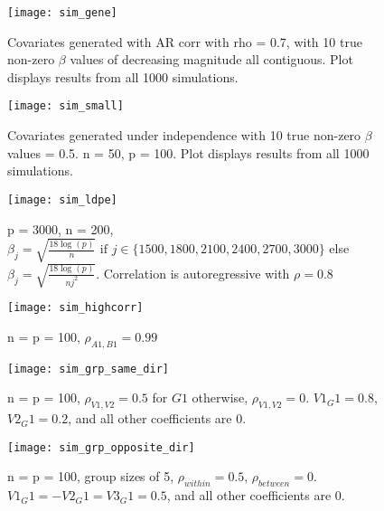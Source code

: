 \begin{figure}[hbtp]
    \begin{center}
    \texttt{[image: sim\_gene]}
    \caption{\label{Fig:sim_gene} Covariates generated with AR corr with rho = 0.7, with 10 true non-zero $\beta$ values of decreasing magnitude all contiguous. Plot displays results from all 1000 simulations.}
    \end{center}
\end{figure}

\begin{figure}[hbtp]
    \begin{center}
    \texttt{[image: sim\_small]}
    \caption{\label{Fig:sim_small} Covariates generated under independence with 10 true non-zero $\beta$ values = 0.5. n = 50, p = 100. Plot displays results from all 1000 simulations.}
    \end{center}
\end{figure}


\begin{figure}[hbtp]
    \begin{center}
    \texttt{[image: sim\_ldpe]}
    \caption{\label{Fig:sim_ldpe} p = 3000, n = 200, $\beta_j = \sqrt{\frac{18\log(p)}{n}} \text{ if } j \in \lbrace 1500, 1800, 2100, 2400, 2700, 3000 \rbrace$ else $\beta_j = \sqrt{\frac{18\log(p)}{nj^2}}$. Correlation is autoregressive with $\rho = 0.8$}
    \end{center}
\end{figure}


\begin{figure}[hbtp]
    \begin{center}
    \texttt{[image: sim\_highcorr]}
    \caption{\label{Fig:sim_highcorr} n = p = 100, $\rho_{A1, B1} = 0.99$}
    \end{center}
\end{figure}

\begin{figure}[hbtp]
    \begin{center}
    \texttt{[image: sim\_grp\_same\_dir]}
    \caption{\label{Fig:sim_grp_same_dir} n = p = 100, $\rho_{V1, V2} = 0.5$ for $G1$ otherwise, $\rho_{V1, V2} = 0$. $V1_G1 = 0.8$, $V2_G1 = 0.2$, and all other coefficients are 0.}
    \end{center}
\end{figure}

\begin{figure}[hbtp]
    \begin{center}
    \texttt{[image: sim\_grp\_opposite\_dir]}
    \caption{\label{Fig:sim_grp_opposite_dir} n = p = 100, group sizes of 5, $\rho_{within} = 0.5$, $\rho_{between} = 0$. $V1_G1 = -V2_G1 = V3_G1 = 0.5$, and all other coefficients are 0.}
    \end{center}
\end{figure}

